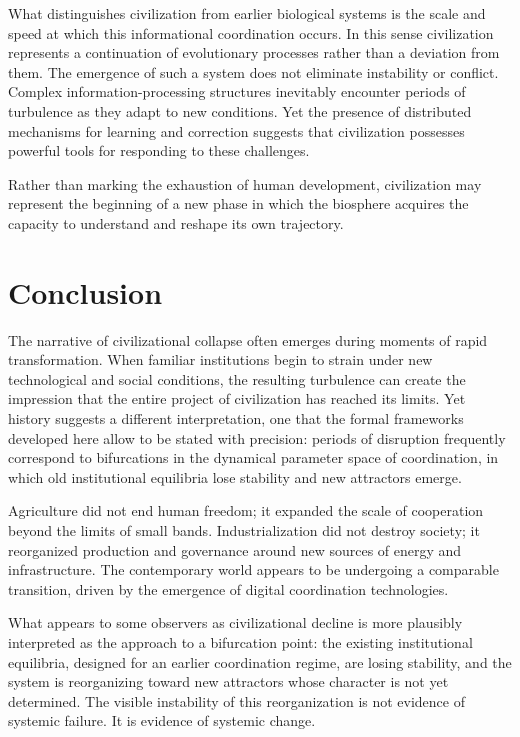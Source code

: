 \documentclass[12pt]{article}
\begin{document}
What distinguishes civilization from earlier biological systems is the scale and speed at which this informational coordination occurs. In this sense civilization represents a continuation of evolutionary processes rather than a deviation from them. The emergence of such a system does not eliminate instability or conflict. Complex information-processing structures inevitably encounter periods of turbulence as they adapt to new conditions. Yet the presence of distributed mechanisms for learning and correction suggests that civilization possesses powerful tools for responding to these challenges.

Rather than marking the exhaustion of human development, civilization may represent the beginning of a new phase in which the biosphere acquires the capacity to understand and reshape its own trajectory.

\section{Conclusion}

The narrative of civilizational collapse often emerges during moments of rapid transformation. When familiar institutions begin to strain under new technological and social conditions, the resulting turbulence can create the impression that the entire project of civilization has reached its limits. Yet history suggests a different interpretation, one that the formal frameworks developed here allow to be stated with precision: periods of disruption frequently correspond to bifurcations in the dynamical parameter space of coordination, in which old institutional equilibria lose stability and new attractors emerge.

Agriculture did not end human freedom; it expanded the scale of cooperation beyond the limits of small bands. Industrialization did not destroy society; it reorganized production and governance around new sources of energy and infrastructure. The contemporary world appears to be undergoing a comparable transition, driven by the emergence of digital coordination technologies.

What appears to some observers as civilizational decline is more plausibly interpreted as the approach to a bifurcation point: the existing institutional equilibria, designed for an earlier coordination regime, are losing stability, and the system is reorganizing toward new attractors whose character is not yet determined. The visible instability of this reorganization is not evidence of systemic failure. It is evidence of systemic change.
\end{document}
